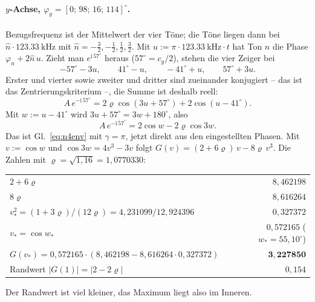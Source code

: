 \documentclass[11pt,a4paper]{article}
\begin{document}
\paragraph{\boldmath$y$-Achse, $\varphi_y=[0;\,98;\,16;\,114]^\circ$.}
Bezugsfrequenz ist der Mittelwert der vier Töne; die Töne liegen dann bei
$\hat n\cdot\SI{123.33}{\kilo\hertz}$ mit $\hat n=-\tfrac32,-\tfrac12,\tfrac12,\tfrac32$.
Mit $u := \pi\cdot\SI{123.33}{\kilo\hertz}\cdot t$ hat Ton $n$ die Phase
$\varphi_n + 2\hat n\,u$. Zieht man $e^{\mathrm{i}\,57^\circ}$ heraus
($57^\circ = c_y/2$), stehen die vier Zeiger bei
\begin{equation}
  -57^\circ-3u,\qquad 41^\circ-u,\qquad -41^\circ+u,\qquad 57^\circ+3u .
\end{equation}
Erster und vierter sowie zweiter und dritter sind zueinander konjugiert --
das ist das Zentrierungskriterium --, die Summe ist deshalb reell:
\begin{equation}
  A\,e^{-\mathrm{i}\,57^\circ} = 2\varrho\cos(3u+57^\circ) + 2\cos(u-41^\circ) .
\end{equation}
Mit $w := u-41^\circ$ wird $3u+57^\circ = 3w+180^\circ$, also
\begin{equation}
  A\,e^{-\mathrm{i}\,57^\circ} = 2\cos w - 2\varrho\cos 3w .
\end{equation}
Das ist Gl.~\eqref{eq:n4env} mit $\gamma=\pi$, jetzt direkt aus den
eingestellten Phasen. Mit $v:=\cos w$ und $\cos3w=4v^3-3v$ folgt
$G(v)=(2+6\varrho)\,v-8\varrho\,v^3$. Die Zahlen mit
$\varrho=\sqrt{1{,}16}=1{,}0770330$:
\begin{center}
\begin{tabular}{@{}lr@{}}
  \toprule
  $2+6\varrho$ & $8{,}462198$\\
  $8\varrho$ & $8{,}616264$\\
  $v_*^2 = (1+3\varrho)/(12\varrho) = 4{,}231099/12{,}924396$ & $0{,}327372$\\
  $v_* = \cos w_*$ & $0{,}572165$ \quad ($w_*=55{,}10^\circ$)\\
  $G(v_*) = 0{,}572165\cdot(8{,}462198-8{,}616264\cdot0{,}327372)$ & $\mathbf{3{,}227850}$\\
  Randwert $|G(1)| = |2-2\varrho|$ & $0{,}154$\\
  \bottomrule
\end{tabular}
\end{center}
Der Randwert ist viel kleiner, das Maximum liegt also im Inneren.
\end{document}
